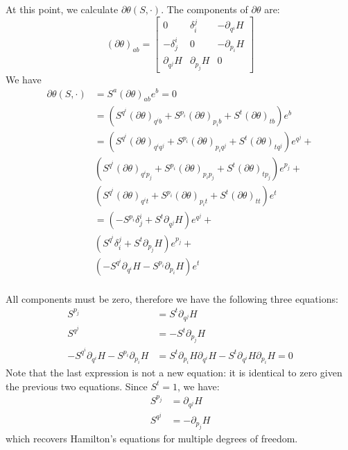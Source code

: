 \documentclass[10pt,twocolumn, nofootinbib]{revtex4-2}
\begin{document}
At this point, we calculate $\partial\theta(S, \cdot ) $. The components of $\partial\theta$ are:
\begin{equation*}
	(\partial\theta)_{ab} = \begin{bmatrix}
		0 & \delta^j_i & - \partial_{q^i} H \\
		-\delta^i_j & 0 & - \partial_{p_i} H \\
		\partial_{q^j} H & \partial_{p_j} H & 0
	\end{bmatrix}
\end{equation*}
We have
\begin{align*}
	\partial\theta(S, \cdot )  &= S^a (\partial\theta)_{ab} e^b = 0 \\
	&= (S^{q^i}(\partial\theta)_{q^ib} + S^{p_i}(\partial\theta)_{p_ib} + S^{t}(\partial\theta)_{tb}) e^b \\
	&= (S^{q^i}(\partial\theta)_{q^iq^j} + S^{p_i}(\partial\theta)_{p_iq^j} + S^{t}(\partial\theta)_{tq^j}) e^{q^j} + \\
	& (S^{q^i}(\partial\theta)_{q^ip_j} +  S^{p_i}(\partial\theta)_{p_ip_j} + S^{t}(\partial\theta)_{tp_j}) e^{p_j} + \\
	& (S^{q^i}(\partial\theta)_{q^it} + S^{p_i}(\partial\theta)_{p_it} + S^{t}(\partial\theta)_{tt}) e^t \\
	&= (-S^{p_i}\delta^i_j + S^{t}\partial_{q^j} H ) e^{q^j} + \\
	& (S^{q^i}\delta^j_i +  S^{t}\partial_{p_j} H) e^{p_j} + \\
	& (-S^{q^i} \partial_{q^i} H - S^{p_i} \partial_{p_i} H) e^t \\
\end{align*}

All components must be zero, therefore we have the following three equations:
\begin{align*}
	S^{p_j} &= S^{t} \partial_{q^j} H \\
	S^{q^j} &= - S^{t}\partial_{p_j} H \\
	-S^{q^i} \partial_{q^i} H - S^{p_i} \partial_{p_i} H &= S^{t}\partial_{p_i} H \partial_{q^i} H - S^{t} \partial_{q^i} H \partial_{p_i} H = 0
\end{align*}
Note that the last expression is not a new equation: it is identical to zero given the previous two equations. Since $S^t = 1$, we have:
\begin{align*}
	S^{p_j} &= \partial_{q^j} H \\
	S^{q^j} &= - \partial_{p_j} H
\end{align*}
which recovers Hamilton's equations for multiple degrees of freedom.
\end{document}
